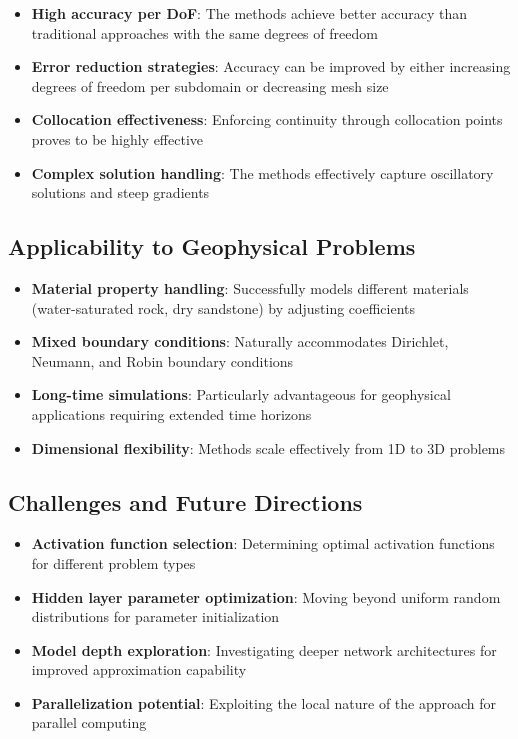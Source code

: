 \documentclass[11pt,a4paper]{article}
\begin{document}
\begin{itemize}
    \item \textbf{High accuracy per DoF}: The methods achieve better accuracy than traditional approaches with the same degrees of freedom
    \item \textbf{Error reduction strategies}: Accuracy can be improved by either increasing degrees of freedom per subdomain or decreasing mesh size
    \item \textbf{Collocation effectiveness}: Enforcing continuity through collocation points proves to be highly effective
    \item \textbf{Complex solution handling}: The methods effectively capture oscillatory solutions and steep gradients
\end{itemize}

\subsection{Applicability to Geophysical Problems}

\begin{itemize}
    \item \textbf{Material property handling}: Successfully models different materials (water-saturated rock, dry sandstone) by adjusting coefficients
    \item \textbf{Mixed boundary conditions}: Naturally accommodates Dirichlet, Neumann, and Robin boundary conditions
    \item \textbf{Long-time simulations}: Particularly advantageous for geophysical applications requiring extended time horizons
    \item \textbf{Dimensional flexibility}: Methods scale effectively from 1D to 3D problems
\end{itemize}

\subsection{Challenges and Future Directions}

\begin{itemize}
    \item \textbf{Activation function selection}: Determining optimal activation functions for different problem types
    \item \textbf{Hidden layer parameter optimization}: Moving beyond uniform random distributions for parameter initialization
    \item \textbf{Model depth exploration}: Investigating deeper network architectures for improved approximation capability
    \item \textbf{Parallelization potential}: Exploiting the local nature of the approach for parallel computing
\end{itemize}
\end{document}
